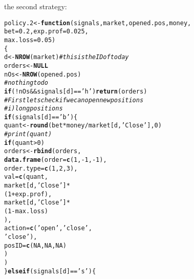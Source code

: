 \documentclass{article}\usepackage[]{graphicx}\usepackage[]{color}
\makeatletter
\newcommand{\hlnum}[1]{\textcolor[rgb]{0.686,0.059,0.569}{#1}}%
\newcommand{\hlstr}[1]{\textcolor[rgb]{0.192,0.494,0.8}{#1}}%
\newcommand{\hlcom}[1]{\textcolor[rgb]{0.678,0.584,0.686}{\textit{#1}}}%
\newcommand{\hlopt}[1]{\textcolor[rgb]{0,0,0}{#1}}%
\newcommand{\hlstd}[1]{\textcolor[rgb]{0.345,0.345,0.345}{#1}}%
\newcommand{\hlkwa}[1]{\textcolor[rgb]{0.161,0.373,0.58}{\textbf{#1}}}%
\newcommand{\hlkwb}[1]{\textcolor[rgb]{0.69,0.353,0.396}{#1}}%
\newcommand{\hlkwc}[1]{\textcolor[rgb]{0.333,0.667,0.333}{#1}}%
\newcommand{\hlkwd}[1]{\textcolor[rgb]{0.737,0.353,0.396}{\textbf{#1}}}%
\newenvironment{kframe}{%
 \def\at@end@of@kframe{}%
 \ifinner\ifhmode%
  \def\at@end@of@kframe{\end{minipage}}%
  \begin{minipage}{\columnwidth}%
 \fi\fi%
 \def\FrameCommand##1{\hskip\@totalleftmargin \hskip-\fboxsep
 \colorbox{shadecolor}{##1}\hskip-\fboxsep
     \hskip-\linewidth \hskip-\@totalleftmargin \hskip\columnwidth}%
 \MakeFramed {\advance\hsize-\width
   \@totalleftmargin\z@ \linewidth\hsize
   \@setminipage}}%
 {\par\unskip\endMakeFramed%
 \at@end@of@kframe}
\newenvironment{knitrout}{}{} %
\makeatother
\begin{document}
the second strategy:
\begin{knitrout}
\color{fgcolor}\begin{kframe}
\begin{alltt}
\hlstd{policy.2} \hlkwb{<-} \hlkwa{function}\hlstd{(}\hlkwc{signals}\hlstd{,} \hlkwc{market}\hlstd{,} \hlkwc{opened.pos}\hlstd{,} \hlkwc{money}\hlstd{,}
                     \hlkwc{bet} \hlstd{=} \hlnum{0.2}\hlstd{,} \hlkwc{exp.prof} \hlstd{=} \hlnum{0.025}\hlstd{,}
                     \hlkwc{max.loss} \hlstd{=} \hlnum{0.05}\hlstd{)}
\hlstd{\{}
  \hlstd{d} \hlkwb{<-} \hlkwd{NROW}\hlstd{(market)} \hlcom{#this is the ID of today}
  \hlstd{orders} \hlkwb{<-} \hlkwa{NULL}
  \hlstd{nOs} \hlkwb{<-} \hlkwd{NROW}\hlstd{(opened.pos)}
  \hlcom{#nothing to do}
  \hlkwa{if}\hlstd{(}\hlopt{!}\hlstd{nOs} \hlopt{&&} \hlstd{signals[d]} \hlopt{==} \hlstr{'h'}\hlstd{)} \hlkwd{return} \hlstd{(orders)}
  \hlcom{#First lets check if we can open new positions}
  \hlcom{# i) long positions}
  \hlkwa{if} \hlstd{(signals[d]} \hlopt{==} \hlstr{'b'}\hlstd{)\{}
    \hlstd{quant} \hlkwb{<-} \hlkwd{round}\hlstd{(bet}\hlopt{*}\hlstd{money}\hlopt{/}\hlstd{market[d,} \hlstr{'Close'}\hlstd{],} \hlnum{0}\hlstd{)}
   \hlcom{# print(quant)}
    \hlkwa{if} \hlstd{(quant} \hlopt{>} \hlnum{0}\hlstd{)}
      \hlstd{orders} \hlkwb{<-} \hlkwd{rbind}\hlstd{(orders,}
                      \hlkwd{data.frame}\hlstd{(}\hlkwc{order} \hlstd{=} \hlkwd{c}\hlstd{(}\hlnum{1}\hlstd{,} \hlopt{-}\hlnum{1}\hlstd{,} \hlopt{-}\hlnum{1}\hlstd{),}
                                 \hlkwc{order.type} \hlstd{=} \hlkwd{c}\hlstd{(}\hlnum{1}\hlstd{,} \hlnum{2}\hlstd{,} \hlnum{3}\hlstd{),}
                                 \hlkwc{val} \hlstd{=} \hlkwd{c}\hlstd{(quant,}
                                         \hlstd{market[d,} \hlstr{'Close'}\hlstd{]}\hlopt{*}
                                           \hlstd{(}\hlnum{1}\hlopt{+}\hlstd{exp.prof),}
                                         \hlstd{market[d,} \hlstr{'Close'}\hlstd{]}\hlopt{*}
                                           \hlstd{(}\hlnum{1}\hlopt{-}\hlstd{max.loss)}
                                         \hlstd{),}
                                 \hlkwc{action} \hlstd{=} \hlkwd{c}\hlstd{(}\hlstr{'open'}\hlstd{,} \hlstr{'close'}\hlstd{,}
                                            \hlstr{'close'}\hlstd{),}
                                 \hlkwc{posID} \hlstd{=} \hlkwd{c}\hlstd{(}\hlnum{NA}\hlstd{,} \hlnum{NA}\hlstd{,} \hlnum{NA}\hlstd{)}
                                 \hlstd{)}
                      \hlstd{)}
  \hlstd{\}} \hlkwa{else if} \hlstd{(signals[d]} \hlopt{==} \hlstr{'s'}\hlstd{) \{}

\end{alltt}
\end{kframe}
\end{knitrout}
\end{document}
